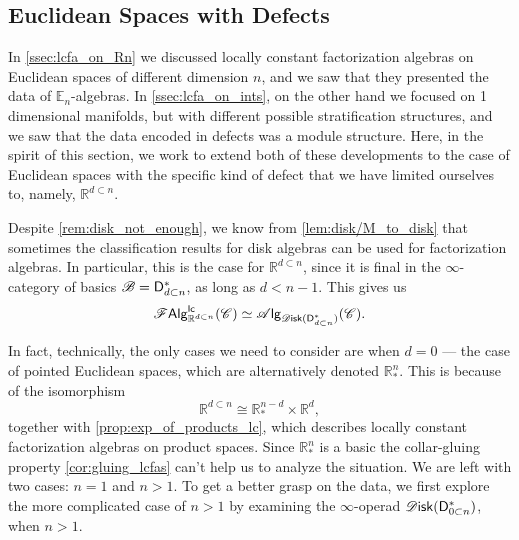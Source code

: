 \documentclass[../text]{subfiles}
\begin{document}
\subsection{Euclidean Spaces with Defects}


In \cref{ssec:lcfa_on_Rn} we discussed locally constant factorization algebras on Euclidean spaces of different dimension $n$, and we saw that they presented the data of $\mathbb{E}_n$-algebras. In \cref{ssec:lcfa_on_ints}, on the other hand we focused on 1 dimensional manifolds, but with different possible stratification structures, and we saw that the data encoded in defects was a module structure. Here, in the spirit of this section, we work to extend both of these developments to the case of Euclidean spaces with the specific kind of defect that we have limited ourselves to, namely, $\mathbb{R}^{d \subset n}$.

Despite \cref{rem:disk_not_enough}, we know from \cref{lem:disk/M_to_disk} that sometimes the classification results for disk algebras can be used for factorization algebras. In particular, this is the case for $\mathbb{R}^{d \subset n}$, since it is final in the $\infty$-category of basics $\mathscr{B} = \mathsf{D}_{d \subset n}^*$, as long as $d < n - 1$. This gives us
%
\begin{equation}\label{eq:focus_on_disk_dn}
    \lcfa_{\mathbb{R}^{d \subset n}} (\catC) \simeq \alg{\disk (\mathsf{D}_{d \subset n}^*)} (\catC).
\end{equation}

In fact, technically, the only cases we need to consider are when $d=0$ --- the case of pointed Euclidean spaces, which are alternatively denoted $\mathbb{R}^n_*$. This is because of the isomorphism
%
\begin{equation}
    \mathbb{R}^{d \subset n} \cong \mathbb{R}^{n-d}_* \times \mathbb{R}^d,
\end{equation}
%
together with \cref{prop:exp_of_products_lc}, which describes locally constant factorization algebras on product spaces. Since $\mathbb{R}^n_*$ is a basic the collar-gluing property \cref{cor:gluing_lcfas} can't help us to analyze the situation. We are left with two cases: $n=1$ and $n > 1$. To get a better grasp on the data, we first explore the more complicated case of $n > 1$ by examining the $\infty$-operad $\disk(\mathsf{D}_{0 \subset n}^*)$, when $n > 1$. 
\end{document}
